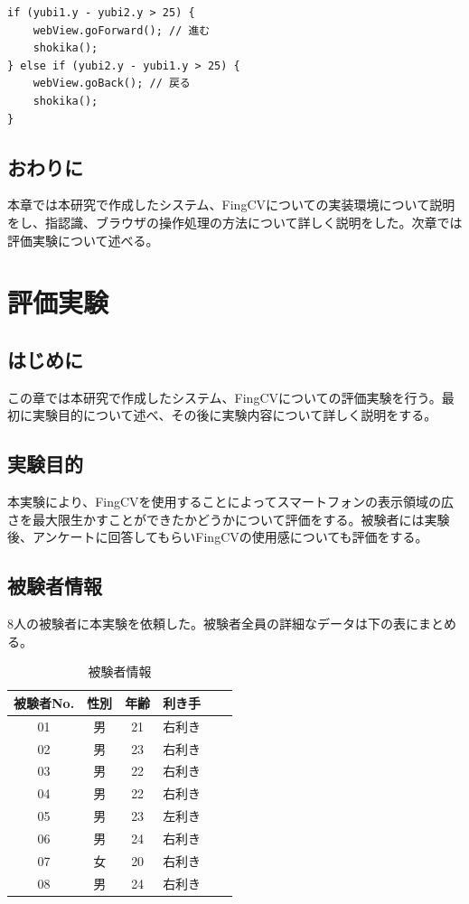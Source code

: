 \documentclass[11pt,a4j, titlepage]{jarticle} %
\begin{document}
\begin{lstlisting}[basicstyle=\ttfamily\footnotesize, frame=single]
if (yubi1.y - yubi2.y > 25) {
	webView.goForward(); // 進む
	shokika();
} else if (yubi2.y - yubi1.y > 25) {
	webView.goBack(); // 戻る
	shokika();
}
\end{lstlisting}

\subsection{おわりに}
本章では本研究で作成したシステム、FingCVについての実装環境について説明をし、指認識、ブラウザの操作処理の方法について詳しく説明をした。次章では評価実験について述べる。

\newpage
\section{評価実験}
\subsection{はじめに}
この章では本研究で作成したシステム、FingCVについての評価実験を行う。最初に実験目的について述べ、その後に実験内容について詳しく説明をする。

\subsection{実験目的}
本実験により、FingCVを使用することによってスマートフォンの表示領域の広さを最大限生かすことができたかどうかについて評価をする。被験者には実験後、アンケートに回答してもらいFingCVの使用感についても評価をする。

\subsection{被験者情報}
8人の被験者に本実験を依頼した。被験者全員の詳細なデータは下の表にまとめる。

\begin{table}[H]
	\begin{center}
	\begin{tabular}{|c|c|c|c|c|c|} \hline
		被験者No. & 性別 & 年齢 & 利き手 \\ \hline \hline
		01 & 男 & 21 & 右利き \\
		02 & 男 & 23 & 右利き \\
		03 & 男 & 22 & 右利き \\
		04 & 男 & 22 & 右利き \\
		05 & 男 & 23 & 左利き \\
		06 & 男 & 24 & 右利き \\
		07 & 女 & 20 & 右利き \\
		08 & 男 & 24 & 右利き \\ \hline
	\end{tabular}
	\caption{被験者情報}
	\label{table1}
	\end{center}
\end{table}
\end{document}
